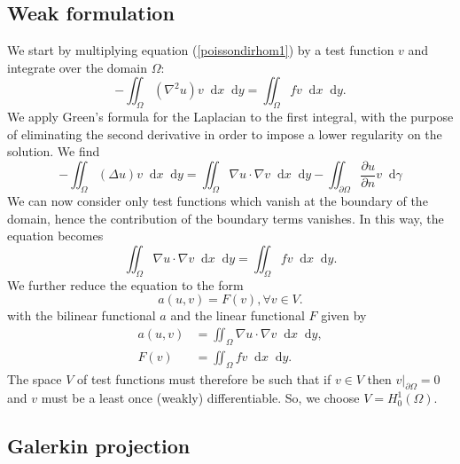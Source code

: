 \documentclass{report}
\renewcommand*\d{\mathop{}\!\mathrm{d}}
\begin{document}
\subsection{Weak formulation}

We start by multiplying equation (\ref{poissondirhom1}) by a test function $v$ and integrate over the domain $\Omega$:
\begin{equation}
-\iint_{\Omega} (\nabla^2 u) v \d x \d y = \iint_{\Omega}fv \d x \d y.
\end{equation}
We apply Green's formula for the Laplacian to the first integral, with the purpose of eliminating the second derivative in order to impose a lower regularity on the solution. We find
\begin{equation}
-\iint_{\Omega} (\Delta u) v \d x \d y = \iint_{\Omega}\nabla u \cdot \nabla v \d x \d y -  \iint_{\partial \Omega} \frac{\partial u}{\partial n} v \d\gamma  
\end{equation}
We can now consider only test functions which vanish at the boundary of the domain, hence the contribution of the boundary terms vanishes. In this way, the equation becomes
\begin{equation}
\iint_{\Omega} \nabla u \cdot \nabla v \d x \d y = \iint_{\Omega}fv \d x \d y.
\end{equation}
We further reduce the equation to the form
\begin{equation}
	a(u,v) = F(v), \forall v \in V.
\end{equation}
with the bilinear functional $a$ and the linear functional $F$ given by
\begin{align}
	a(u,v) &=  \iint_{\Omega} \nabla u \cdot \nabla v \d x \d y, \\
	F(v) &= \iint_{\Omega}fv \d x \d y.
\end{align}
The space $V$ of test functions must therefore be such that if $v \in V$ then $v |_{\partial \Omega} = 0$ and $v$ must be a least once (weakly) differentiable. So, we choose $V = H_0^1(\Omega)$.

\subsection{Galerkin projection}
\end{document}
